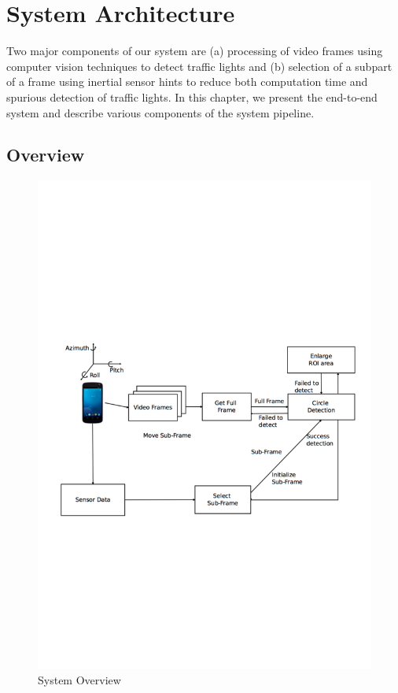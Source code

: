 \chapter{System Architecture}
\label{c:system}
Two major components of our system are (a) processing of video frames using computer vision techniques to detect traffic lights and (b) selection of a subpart of a frame using inertial sensor hints to reduce both computation time and spurious detection of traffic lights. 
In this chapter, we present the end-to-end system and describe various components of the system pipeline.


\section{Overview}
\label{s:overview}


\begin{figure}
\centering
\includegraphics[width=5.2in]{figures/sysdia1.pdf}
\caption{System Overview}
\label{f:sys_dia}
\end{figure}


